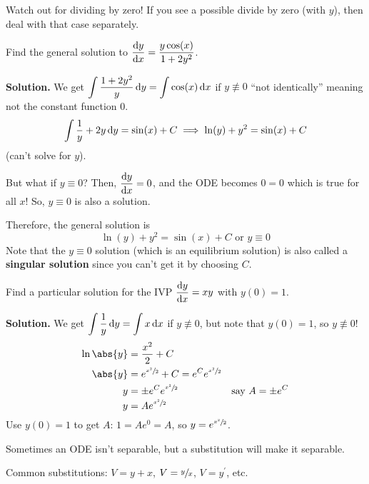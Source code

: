 \begin{Remark}{}{}
    Watch out for dividing by zero! If you see a possible divide
    by zero (with $ y $), then deal with that case separately.
\end{Remark}

\begin{Example}{}{}
    Find the general solution to
    $ \displaystyle \odv{y}{x}=\frac{y\cos(x)}{1+2y^2} $.

    \textbf{Solution.} We get
    $ \displaystyle  \int \frac{1+2y^2}{y} \odif{y} =\int \cos(x)\odif{x} $
    if $ y\not\equiv 0 $ ``not identically'' meaning not the constant function $ 0 $.
    \[ \int \frac{1}{y} +2y\odif{y} =\sin(x)+C\implies \ln(y)+y^2=\sin(x)+C \]
    (can't solve for $ y $).

    But what if $ y\equiv 0 $? Then, $ \displaystyle\odv{y}{x} =0 $, and the ODE becomes
    $ 0=0 $ which is true for all $ x $! So, $ y\equiv 0 $ is also a solution.

    Therefore, the general solution is
    \[ \ln(y)+y^2=\sin(x)+C \text{ or }y\equiv 0 \]
    Note that the $ y\equiv 0 $ solution (which is an equilibrium solution) is also
    called a \textbf{singular solution} since you can't get it by choosing $ C $.
\end{Example}

\begin{Example}{}{}
    Find a particular solution for the IVP
    $ \displaystyle\odv{y}{x} =xy $
    with $ y(0)=1 $.

    \textbf{Solution.} We get
    $ \displaystyle  \int \frac{1}{y} \odif{y} =\int x\odif{x} $
    if $ y\not\equiv 0 $, but note that $ y(0)=1 $, so $ y\not\equiv 0 $!
    \begin{align*}
        \ln\abs{y} & =\frac{x^2}{2} +C                                                    \\
        \abs{y}    & =e^{\sfrac{x^2}{2}}+C=e^C e^{\sfrac{x^2}{2}}                         \\
        y          & =\pm e^C e^{\sfrac{x^2}{2}}                  & \text{say } A=\pm e^C \\
        y          & =Ae^{\sfrac{x^2}{2}}
    \end{align*}
    Use $ y(0)=1 $ to get $ A $: $ 1=Ae^0=A $, so $ y=e^{\sfrac{x^2}{2}} $.
\end{Example}

Sometimes an ODE isn't separable, but a substitution will make it separable.

Common substitutions: $ V=y+x $, $ V=\sfrac{y}{x} $, $ V=y^\prime $, etc.


